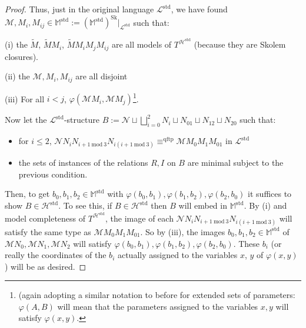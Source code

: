\documentclass{amsart}
\theoremstyle{definition}
\theoremstyle{remark}
\numberwithin{equation}{section}
\begin{document}
\begin{proof}
     Thus, just in the original language $\mathcal{L}^{\mathrm{std}}$, we have found $\mathcal{M}, M_{i}, M_{ij} \in \mathbb{M}^{\mathrm{std}} :=(\mathbb{M}^{\mathrm{std}})^{\mathrm{Sk}}|_{\mathcal{L}^{\mathrm{std}}}$ such that:

     (i) the $\tilde{M}$, $\tilde{M}M_{i}$, $\tilde{M}M_{i}M_{j}M_{ij}$ are all models of $T^{\mathcal{H}^{\mathrm{std}}}$ (because they are Skolem closures).

     (ii) the $\mathcal{M}, M_i, M_{ij}$ are all disjoint

     (iii)  For all $i < j$, $\varphi(\mathcal{M}M_{i}, \mathcal{M}M_{j})$\footnote{(again adopting a similar notation to before for extended sets of parameters: $\varphi(A, B)$ will mean that the  parameters assigned to the variables $x, y$ will satisfy $\varphi(x, y)$.}.


     Now let the $\mathcal{L}^{\mathrm{std}}$-structure $B:= \mathcal{N} \sqcup \bigsqcup^{2}_{i=0} N_{i} \sqcup N_{01} \sqcup N_{12} \sqcup N_{20}$ such that:

     \begin{itemize}
         \item for $i \leq 2$,  $\mathcal{N} N_{i}N_{i+1 \mathrm{\: mod \:} 3} N_{i(i+1 \mathrm{\: mod \:} 3)}\equiv^{\mathrm{qftp}} \mathcal{M}M_{0}M_{1}M_{01}$ in $\mathcal{L}^{\mathrm{std}}$
         \item the sets of instances of the relations $R, I$ on $B$ are minimal subject to the previous condition.  
     \end{itemize}
     
  
Then, to get  $b_0, b_1, b_2 \in \mathbb{M}^{\mathrm{std}}$ with $\varphi(b_0, b_1),\varphi(b_1, b_2), \varphi(b_2, b_0) $ it suffices to show $B \in \mathcal{H}^{\mathrm{std}}$. To see this, if $B \in \mathcal{H}^{\mathrm{std}}$ then $B$ will embed in $\mathbb{M}^{\mathrm{std}}$. By (i) and model completeness of $T^{\mathcal{H}^{\mathrm{std}}}$, the image of each $\mathcal{N} N_{i}N_{i+1 \mathrm{\: mod \:} 3} N_{i(i+1 \mathrm{\: mod \:} 3)}$ will satisfy the same type as $\mathcal{M}M_{0}M_{1}M_{01}$. So by (iii), the images  $b_0, b_1, b_2 \in \mathbb{M}^{\mathrm{std}}$ of $\mathcal{M}N_{0}, \mathcal{M}N_{1}, \mathcal{M}N_{2}$ will satisfy $\varphi(b_0, b_1),\varphi(b_1, b_2), \varphi(b_2, b_0) $. These $b_i$ (or really the coordinates of the $b_i$ actually assigned to the variables $x$, $y$ of $\varphi(x, y)$) will be as desired. 


\end{proof}
\end{document}
